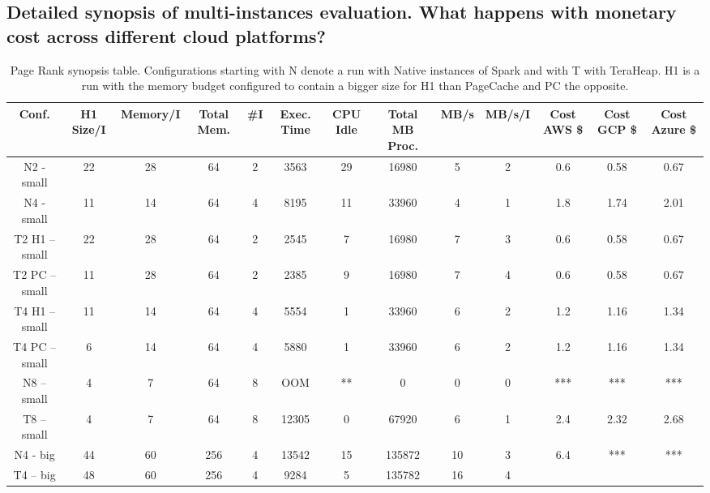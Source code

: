 \subsection{Detailed synopsis of multi-instances evaluation. What
happens with monetary cost across different cloud platforms?}


\begin{table}[htbp]
  \centering
	\begin{subtable}[b]{0.45\linewidth}
  \caption{Page Rank synopsis table. Configurations starting
    with N denote a run with Native instances of Spark and with T with
    TeraHeap. H1 is a run with the memory budget configured to contain
    a bigger size for H1 than PageCache and PC the opposite.}
  \label{tab:pr_table}
        \begin{tabular}{|c|c|c|c|c|c|c|c|c|c|c|c|c|}
      \hline
\textbf{Conf.} & \textbf{H1 Size/I} & \textbf{Memory/I} & \textbf{Total Mem.} & \textbf{\#I} & \textbf{Exec. Time} & \textbf{CPU Idle} & \textbf{Total MB Proc.} & \textbf{MB/s} & \textbf{MB/s/I} & \textbf{Cost AWS \$} & \textbf{Cost GCP \$} & \textbf{Cost Azure \$} \\
        \hline
    N2 - small & 22 & 28 & 64 & 2 & 3563 & 29 & 16980 & 5 & 2 & 0.6 & 0.58 & 0.67 \\
    N4 - small & 11 & 14 & 64 & 4 & 8195 & 11 & 33960 & 4 & 1 & 1.8 & 1.74 & 2.01 \\
    T2 H1 – small & 22 & 28 & 64 & 2 & 2545 & 7 & 16980 & 7 & 3 & 0.6 & 0.58 & 0.67 \\
    T2 PC – small & 11 & 28 & 64 & 2 & 2385 & 9 & 16980 & 7 & 4 & 0.6 & 0.58 & 0.67 \\
    T4 H1 – small & 11 & 14 & 64 & 4 & 5554 & 1 & 33960 & 6 & 2 & 1.2 & 1.16 & 1.34 \\
    T4 PC – small & 6 & 14 & 64 & 4 & 5880 & 1 & 33960 & 6 & 2 & 1.2 & 1.16 & 1.34 \\
    N8 – small & 4 & 7 & 64 & 8 & OOM & ** & 0 & 0 & 0 & *** & *** & *** \\
    T8 – small & 4 & 7 & 64 & 8 & 12305 & 0 & 67920 & 6 & 1 & 2.4 & 2.32 & 2.68 \\
    N4 - big & 44 & 60 & 256 & 4 & 13542 & 15 & 135872 & 10 & 3 & 6.4 & *** & *** \\
    T4 – big & 48 & 60 & 256 & 4 & 9284 & 5 & 135782 & 16 & 4 \\      
	\hline
     \end{tabular}%
\end{subtable}


\end{table}
